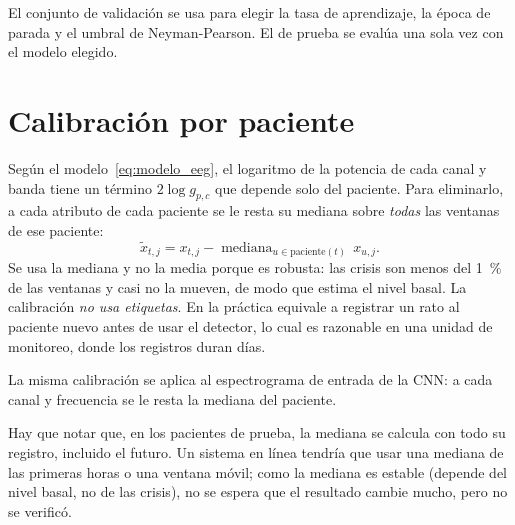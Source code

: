 El conjunto de validación se usa para elegir la tasa de aprendizaje, la época de parada y el umbral de
Neyman-Pearson. El de prueba se evalúa una sola vez con el modelo elegido.

\section{Calibración por paciente}
\label{sec:calibracion}

Según el modelo~\eqref{eq:modelo_eeg}, el logaritmo de la potencia de cada canal y banda tiene un término
$2\log g_{p,c}$ que depende solo del paciente. Para eliminarlo, a cada atributo de cada paciente se le resta su
mediana sobre \emph{todas} las ventanas de ese paciente:
\begin{equation}
  \tilde x_{t,j} = x_{t,j} - \operatorname{mediana}_{u \in \text{paciente}(t)}\, x_{u,j}.
  \label{eq:calibracion}
\end{equation}
Se usa la mediana y no la media porque es robusta: las crisis son menos del 1~\% de las ventanas y casi no la
mueven, de modo que estima el nivel basal. La calibración \emph{no usa etiquetas}. En la práctica equivale a
registrar un rato al paciente nuevo antes de usar el detector, lo cual es razonable en una unidad de monitoreo,
donde los registros duran días.

La misma calibración se aplica al espectrograma de entrada de la CNN: a cada canal y frecuencia se le resta la
mediana del paciente.

Hay que notar que, en los pacientes de prueba, la mediana se calcula con todo su registro, incluido el futuro. Un
sistema en línea tendría que usar una mediana de las primeras horas o una ventana móvil; como la mediana es estable
(depende del nivel basal, no de las crisis), no se espera que el resultado cambie mucho, pero no se verificó.

